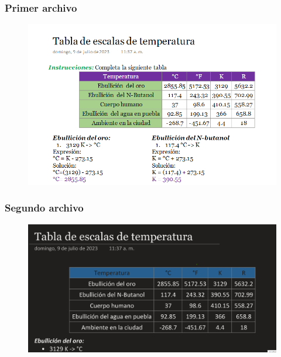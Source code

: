 \documentclass[14pt]{beamer}
\begin{document}
\begin{frame}
\frametitle{Primer archivo}
\begin{figure}
    \includegraphics[scale=0.4]{Imagenes/Evidencia_01.png}
\end{figure}
\end{frame}
\begin{frame}
\frametitle{Segundo archivo}
\begin{figure}
    \includegraphics[scale=0.4]{Imagenes/Evidencia_03.png}
\end{figure}
\end{frame}
\end{document}

